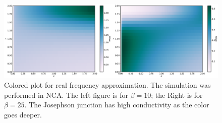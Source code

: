 \documentclass{article}[12pt]
\begin{document}
\begin{spacing}{1.5}
\begin{figure}[H]
  \centerline{\includegraphics[width=16cm]{TexFigure/4_4_03_chi_color.png}}
  \caption{Colored plot for real frequency approximation. The simulation was performed in NCA. The left figure is for $\beta=10$; the Right is for $\beta=25$.
  The Josephson junction has high conductivity as the color goes deeper.}
 \end{figure}
\pagebreak

\end{spacing}
\end{document}

